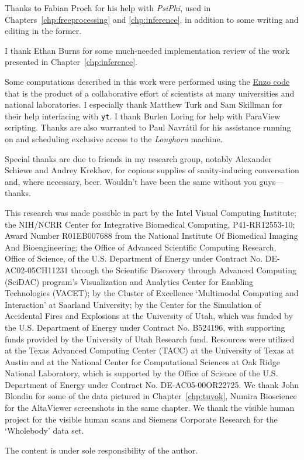 Thanks to Fabian Proch for his help with \textit{PsiPhi}, used in
Chapters~\ref{chp:freeprocessing} and \ref{chp:inference}, in addition
to some writing and editing in the former.

I thank Ethan Burns for some much-needed implementation review of the
work presented in Chapter~\ref{chp:inference}.

Some computations described in this work were performed using the
\href{http://enzo-project.org}{Enzo code} that is the product of a
collaborative effort of scientists at many universities and national
laboratories.  I especially thank Matthew Turk and Sam Skillman for
their help interfacing with \texttt{yt}.  I thank Burlen Loring for
help with ParaView scripting.  Thanks are also warranted to Paul
Navr\'{a}til for his assistance running on and scheduling exclusive
access to the
\textit{Longhorn} machine.

Special thanks are due to friends in my research group, notably
Alexander Schiewe and Andrey Krekhov, for copious supplies of
sanity-inducing conversation and, where necessary, beer.  Wouldn't have
been the same without you guys---thanks.

This research was made possible in part by the Intel Visual
Computing Institute; the NIH/NCRR Center for Integrative Biomedical
Computing, P41-RR12553-10; Award Number R01EB007688 from the National
Institute Of Biomedical Imaging And Bioengineering; the Office of
Advanced Scientific Computing Research, Office of Science, of the
U.S. Department of Energy under Contract No. DE-AC02-05CH11231
through the Scientific Discovery through Advanced Computing (SciDAC)
program's Visualization and Analytics Center for Enabling Technologies
(VACET); by the Cluster of Excellence `Multimodal Computing and
Interaction' at Saarland University; by the Center for the Simulation
of Accidental Fires and Explosions at the University of Utah, which was
funded by the U.S. Department of Energy under Contract No. B524196,
with supporting funds provided by the University of Utah Research
fund. Resources were utilized at the Texas Advanced Computing Center
(TACC) at the University of Texas at Austin and at the National Center
for Computational Sciences at Oak Ridge National Laboratory, which is
supported by the Office of Science of the U.S. Department of Energy
under Contract No. DE-AC05-00OR22725.  We thank John Blondin for some
of the
data pictured in Chapter~\ref{chp:tuvok}, Numira Bioscience for the
AltaViewer screenshots in the same chapter.  We thank the visible human
project for the visible human scans and Siemens Corporate Research for
the `Wholebody' data set.

The content is under sole responsibility of the author.
